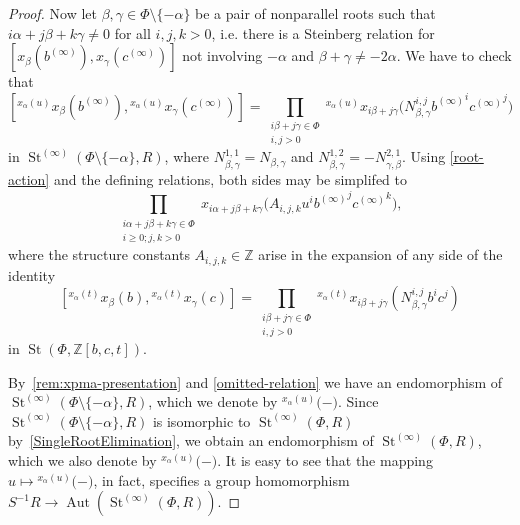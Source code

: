 \documentclass[oneside, 11pt]{amsart}
\numberwithin{equation}{section}
\theoremstyle{definition}
\theoremstyle{remark}
\DeclareMathOperator\St{St}
\DeclareMathOperator\Aut{Aut}
\newcommand{\up}[2]{{^{#1}\!{#2}}}
\begin{document}
\begin{proof}
 Now let \(\beta, \gamma \in \Phi \setminus \{- \alpha\}\) be a pair of nonparallel roots such that \(i\alpha + j\beta + k\gamma \neq 0\) for all \(i, j, k > 0\), i.e. there is a Steinberg relation for \([x_\beta(b^{(\infty)}), x_\gamma(c^{(\infty)})]\) not involving \(-\alpha\) and \(\beta + \gamma \neq -2\alpha\). %
 We have to check that
 \[[\up{x_\alpha(u)}{x_\beta(b^{(\infty)})}, \up{x_\alpha(u)}{x_\gamma(c^{(\infty)})}] = \prod_{\substack{i\beta + j\gamma \in \Phi\\ i, j > 0}} \up{x_\alpha(u)}{x_{i\beta + j\gamma}\bigl(N_{\beta, \gamma}^{i, j} {b^{(\infty)}}^i {c^{(\infty)}}^j \bigr)}\]
 in $\St^{(\infty)}(\Phi \setminus \{-\alpha\}, R)$, where \(N_{\beta, \gamma}^{1, 1} = N_{\beta, \gamma}\) and \(N_{\beta, \gamma}^{1, 2} = -N_{\gamma, \beta}^{2, 1}\). Using \cref{root-action} and the defining relations, both sides may be simplifed to
 \[\prod_{\substack{i\alpha + j \beta + k\gamma \in \Phi\\ i \geq 0; j, k > 0}} x_{i\alpha + j\beta + k\gamma}\bigl(A_{i, j, k} u^i {b^{(\infty)}}^j {c^{(\infty)}}^k\bigr),\]
 where the structure constants \(A_{i, j, k} \in \mathbb Z\) arise in the expansion of any side of the identity
 \[[\up{x_\alpha(t)}{x_\beta(b)}, \up{x_\alpha(t)}{x_\gamma(c)}] = \prod_{\substack{i\beta + j\gamma \in \Phi\\ i, j > 0}} \up{x_\alpha(t)}{x_{i\beta + j\gamma}(N_{\beta, \gamma}^{i, j} b^i c^j)}\]
 in \(\St(\Phi, \mathbb Z[b, c, t])\).

 By~\cref{rem:xpma-presentation} and \cref{omitted-relation} we have an endomorphism of $\St^{(\infty)}(\Phi\setminus\{-\alpha\}, R)$, which we denote by $\up{x_\alpha(u)}(-)$.
 Since $\St^{(\infty)}(\Phi\setminus\{-\alpha\}, R)$ is isomorphic to $\St^{(\infty)}(\Phi, R)$ by~\cref{SingleRootElimination}, we obtain an endomorphism of $\St^{(\infty)}(\Phi, R)$, which we also denote by $\up{x_\alpha(u)}(-)$. It is easy to see that the mapping $u \mapsto \up{x_\alpha(u)}(-)$, in fact, specifies a group homomorphism $S^{-1}R \to \Aut(\St^{(\infty)}(\Phi, R))$. 
 

\end{proof}
\end{document}
